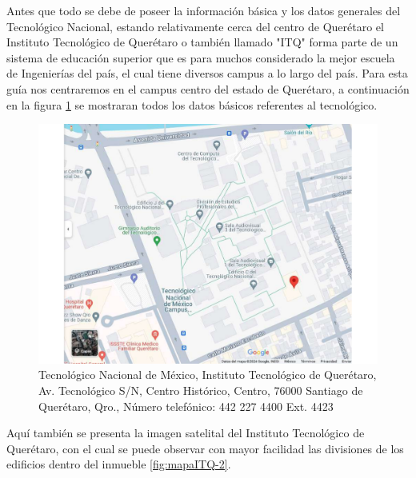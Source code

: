     Antes que todo se debe de poseer la información básica y los datos generales del Tecnológico Nacional, estando relativamente cerca del centro de Querétaro el Instituto Tecnológico de Querétaro o también llamado "ITQ" forma parte de un sistema de educación superior que es para muchos considerado la mejor escuela de Ingenierías del país, el cual tiene diversos campus a lo largo del país. Para esta guía nos centraremos en el campus centro del estado de Querétaro, a continuación en la figura \ref{fig:mapaITQ} se mostraran todos los datos básicos referentes al tecnológico.

\begin{figure}[H]
    \centering
    \includegraphics[scale=0.32]{19/Img/mapaITQ.pdf}
    \caption{Tecnológico Nacional de México, Instituto Tecnológico de Querétaro, Av. Tecnológico S/N, Centro Histórico, Centro, 76000 Santiago de Querétaro, Qro., Número telefónico: 442 227 4400 Ext. 4423}
    \label{fig:mapaITQ}
\end{figure}
    
    Aquí también se presenta la imagen satelital del Instituto Tecnológico de Querétaro, con el cual se puede observar con mayor facilidad las divisiones de los edificios dentro del inmueble \ref{fig:mapaITQ-2}.

